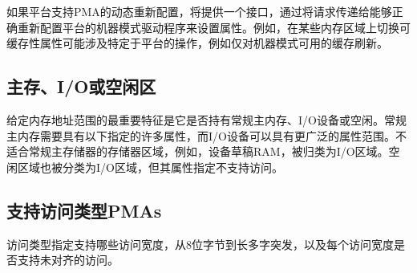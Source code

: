 {\iffalse
Where platforms support dynamic reconfiguration of PMAs, an interface
will be provided to set the attributes by passing requests to a
machine-mode driver that can correctly reconfigure the platform.  For
example, switching cacheability attributes on some memory regions
might involve platform-specific operations, such as cache flushes,
that are available only to machine-mode.
\fi
如果平台支持PMA的动态重新配置，将提供一个接口，通过将请求传递给能够正确重新配置平台的机器模式驱动程序来设置属性。例如，在某些内存区域上切换可缓存性属性可能涉及特定于平台的操作，例如仅对机器模式可用的缓存刷新。

\subsection{主存、I/O或空闲区}

\iffalse
The most important characterization of a given memory address range is
whether it holds regular main memory, or I/O devices, or is vacant.
Regular main memory is required to have a number of properties,
specified below, whereas I/O devices can have a much broader range of
attributes.  Memory regions that do not fit into regular main
memory, for example, device scratchpad RAMs, are categorized as I/O
regions.  Vacant regions are also classified as I/O regions but with
attributes specifying that no accesses are supported.
\fi
给定内存地址范围的最重要特征是它是否持有常规主内存、I/O设备或空闲。常规主内存需要具有以下指定的许多属性，而I/O设备可以具有更广泛的属性范围。不适合常规主存储器的存储器区域，例如，设备草稿RAM，被归类为I/O区域。空闲区域也被分类为I/O区域，但其属性指定不支持访问。

\subsection{支持访问类型PMAs}

\iffalse
Access types specify which access widths, from 8-bit byte to long
multi-word burst, are supported, and also whether misaligned accesses
are supported for each access width.
\fi
访问类型指定支持哪些访问宽度，从8位字节到长多字突发，以及每个访问宽度是否支持未对齐的访问。

}
